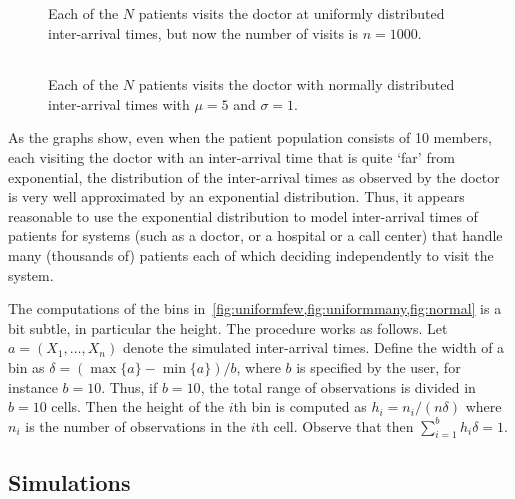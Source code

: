 \begin{figure}[ht]
  \centering
  \begin{tabular}[h]{c}
 \\
  \end{tabular}
  \caption{Each of the $N$ patients visits the doctor at uniformly
    distributed inter-arrival times, but now the number of visits is
    $n=1000$.}
  \label{fig:uniformmany}
\end{figure}

\begin{figure}[ht]
  \centering
  \begin{tabular}[h]{c}
 
  \end{tabular}
  \caption{Each of the $N$ patients visits the doctor with normally
    distributed inter-arrival times with $\mu=5$ and
    $\sigma=1$.}  \label{fig:normal}
\end{figure}

As the graphs show, even when the patient population consists of 10 members, each visiting the doctor with an inter-arrival time that is quite `far' from exponential, the distribution of the inter-arrival times as observed by the doctor is very well approximated by an exponential distribution.
Thus, it appears reasonable to use the exponential distribution to model inter-arrival times of patients for systems (such as a doctor, or a hospital or a call center) that handle many (thousands of) patients each of which deciding independently to visit the system.


\begin{remark}\label{rem:1}
  The computations of the bins in~\cref{fig:uniformfew,fig:uniformmany,fig:normal} is a bit subtle, in particular the height.
  The procedure works as follows.
  Let $a=(X_1, \ldots, X_n)$ denote the simulated inter-arrival times.
  Define the width of a bin as $\delta = (\max\{a\} - \min\{a\})/b$, where $b$ is specified by the user, for instance $b=10$.
  Thus, if $b=10$, the total range of observations is divided in $b=10$ cells.
  Then the height of the $i$th bin is computed as $h_i = n_i/(n \delta)$ where $n_i$ is the number of observations in the $i$th cell.
  Observe that then $\sum_{i=1}^b h_i \delta = 1$.
\end{remark}


\subsection{Simulations}

